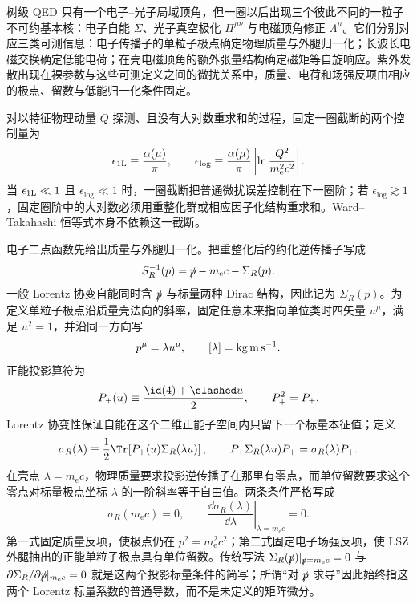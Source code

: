 
树级 QED 只有一个电子--光子局域顶角，但一圈以后出现三个彼此不同的一粒子不可约基本核：电子自能 \(\Sigma\)、光子真空极化 \(\Pi^{\mu\nu}\) 与电磁顶角修正 \(\Lambda^\mu\)。它们分别对应三类可测信息：电子传播子的单粒子极点确定物理质量与外腿归一化；长波长电磁交换确定低能电荷；在壳电磁顶角的额外张量结构确定磁矩等自旋响应。紫外发散出现在裸参数与这些可测定义之间的微扰关系中，质量、电荷和场强反项由相应的极点、留数与低能归一化条件固定。

对以特征物理动量 \(Q\) 探测、且没有大对数重求和的过程，固定一圈截断的两个控制量为
\begin{equation*}
\epsilon_{\rm 1L}\equiv\frac{\alpha(\mu)}{\pi},
\qquad
\epsilon_{\log}\equiv
\frac{\alpha(\mu)}{\pi}
\left|\ln\frac{Q^2}{m_{\mathrm e}^2c^2}\right|.
\end{equation*}
当 \(\epsilon_{\rm 1L}\ll1\) 且 \(\epsilon_{\log}\ll1\) 时，一圈截断把普通微扰误差控制在下一圈阶；若 \(\epsilon_{\log}\gtrsim1\)，固定圈阶中的大对数必须用重整化群或相应因子化结构重求和。Ward--Takahashi 恒等式本身不依赖这一截断。

电子二点函数先给出质量与外腿归一化。把重整化后的约化逆传播子写成
\begin{equation}
{
S_R^{-1}(p)
=\slashed p-m_{\mathrm e} c-\Sigma_R(p).}
\label{eq:qed-renormalized-electron-inverse-dp53}
\end{equation}
一般 Lorentz 协变自能同时含 $\slashed p$ 与标量两种 Dirac 结构，因此记为 $\Sigma_R(p)$。为定义单粒子极点沿质量壳法向的斜率，固定任意未来指向单位类时四矢量 $u^\mu$，满足 $u^2=1$，并沿同一方向写
\begin{equation*}
 p^\mu=\lambda u^\mu,
 \qquad [\lambda]={\rm kg\,m\,s^{-1}}.
\end{equation*}
正能投影算符为
\begin{equation*}
 P_+(u)\equiv\frac{\id(4)+\slashed u}{2},
 \qquad P_+^2=P_+.
\end{equation*}
Lorentz 协变性保证自能在这个二维正能子空间内只留下一个标量本征值；定义
\begin{equation*}
 \sigma_R(\lambda)
 \equiv\frac12\Tr\!\left[P_+(u)\Sigma_R(\lambda u)\right],
 \qquad
 P_+\Sigma_R(\lambda u)P_+=\sigma_R(\lambda)P_+.
\end{equation*}
在壳点 $\lambda=m_{\mathrm e} c$，物理质量要求投影逆传播子在那里有零点，而单位留数要求这个零点对标量极点坐标 $\lambda$ 的一阶斜率等于自由值。两条条件严格写成
\begin{equation}
{
\sigma_R(m_{\mathrm e} c)=0,
\qquad
\left.\frac{\dd\sigma_R(\lambda)}{\dd\lambda}\right|_{\lambda=m_{\mathrm e} c}=0.}
\label{eq:qed-onshell-selfenergy-conditions-dp53}
\end{equation}
第一式固定质量反项，使极点仍在 $p^2=m_{\mathrm e}^2c^2$；第二式固定电子场强反项，使 LSZ 外腿抽出的正能单粒子极点具有单位留数。传统写法
$\Sigma_R(\slashed p)|_{\slashed p=m_{\mathrm e} c}=0$ 与
$\partial\Sigma_R/\partial\slashed p|_{m_{\mathrm e} c}=0$
就是这两个投影标量条件的简写；所谓“对 $\slashed p$ 求导”因此始终指这两个 Lorentz 标量系数的普通导数，而不是未定义的矩阵微分。

